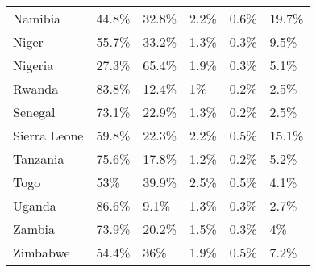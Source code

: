 \begin{table}[ht]
\begin{tabular}{llllll}
  Namibia & 44.8\% & 32.8\% & 2.2\% & 0.6\% & 19.7\% \\ 
  Niger & 55.7\% & 33.2\% & 1.3\% & 0.3\% & 9.5\% \\ 
  Nigeria & 27.3\% & 65.4\% & 1.9\% & 0.3\% & 5.1\% \\ 
  Rwanda & 83.8\% & 12.4\% & 1\% & 0.2\% & 2.5\% \\ 
  Senegal & 73.1\% & 22.9\% & 1.3\% & 0.2\% & 2.5\% \\ 
  Sierra Leone & 59.8\% & 22.3\% & 2.2\% & 0.5\% & 15.1\% \\ 
  Tanzania & 75.6\% & 17.8\% & 1.2\% & 0.2\% & 5.2\% \\ 
  Togo & 53\% & 39.9\% & 2.5\% & 0.5\% & 4.1\% \\ 
  Uganda & 86.6\% & 9.1\% & 1.3\% & 0.3\% & 2.7\% \\ 
  Zambia & 73.9\% & 20.2\% & 1.5\% & 0.3\% & 4\% \\ 
  Zimbabwe & 54.4\% & 36\% & 1.9\% & 0.5\% & 7.2\% \\ 
   \hline
\end{tabular}
\end{table}
